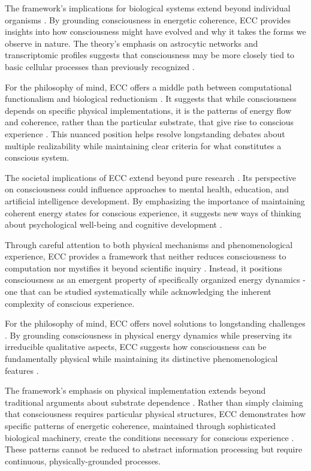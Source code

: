 \begin{refsection}
The framework's implications for biological systems extend beyond individual organisms \cite{rosen2012anticipatory}. By grounding consciousness in energetic coherence, ECC provides insights into how consciousness might have evolved and why it takes the forms we observe in nature. The theory's emphasis on astrocytic networks and transcriptomic profiles suggests that consciousness may be more closely tied to basic cellular processes than previously recognized \cite{thompson2014waking}.

For the philosophy of mind, ECC offers a middle path between computational functionalism and biological reductionism \cite{langer2009philosophy}. It suggests that while consciousness depends on specific physical implementations, it is the patterns of energy flow and coherence, rather than the particular substrate, that give rise to conscious experience \cite{varela2016embodied}. This nuanced position helps resolve longstanding debates about multiple realizability while maintaining clear criteria for what constitutes a conscious system.

The societal implications of ECC extend beyond pure research \cite{feinberg2016ancient}. Its perspective on consciousness could influence approaches to mental health, education, and artificial intelligence development. By emphasizing the importance of maintaining coherent energy states for conscious experience, it suggests new ways of thinking about psychological well-being and cognitive development \cite{zahavi2014self}.

Through careful attention to both physical mechanisms and phenomenological experience, ECC provides a framework that neither reduces consciousness to computation nor mystifies it beyond scientific inquiry \cite{merleau2012phenomenology}. Instead, it positions consciousness as an emergent property of specifically organized energy dynamics - one that can be studied systematically while acknowledging the inherent complexity of conscious experience.

For the philosophy of mind, ECC offers novel solutions to longstanding challenges \cite{pigliucci2013philosophy}. By grounding consciousness in physical energy dynamics while preserving its irreducible qualitative aspects, ECC suggests how consciousness can be fundamentally physical while maintaining its distinctive phenomenological features \cite{block2009comparing}.

The framework's emphasis on physical implementation extends beyond traditional arguments about substrate dependence \cite{noe2009out}. Rather than simply claiming that consciousness requires particular physical structures, ECC demonstrates how specific patterns of energetic coherence, maintained through sophisticated biological machinery, create the conditions necessary for conscious experience \cite{koch2019feeling}. These patterns cannot be reduced to abstract information processing but require continuous, physically-grounded processes.


\end{refsection}
